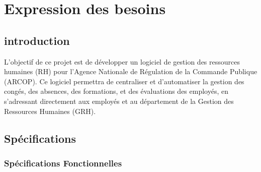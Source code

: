 \chapter{Expression des besoins}
\clearpage
\section{introduction}

L'objectif de ce projet est de développer un logiciel de gestion des ressources humaines (RH) pour l'Agence Nationale de Régulation de la Commande Publique (ARCOP). Ce logiciel permettra de centraliser et d'automatiser la gestion des congés, des absences, des formations, et des évaluations des employés, en s'adressant directement aux employés et au département de la Gestion des Ressources Humaines (GRH).
\section{Spécifications}
\subsection{Spécifications Fonctionnelles}


